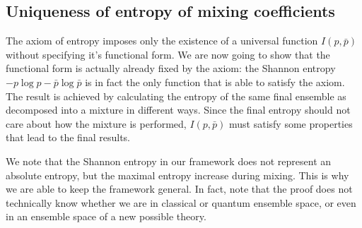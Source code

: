 \subsection{Uniqueness of entropy of mixing coefficients}

The axiom of entropy imposes only the existence of a universal function $I(p,\bar{p})$ without specifying it's functional form. We are now going to show that the functional form is actually already fixed by the axiom: the Shannon entropy $-p \log p - \bar{p} \log \bar{p}$ is in fact the only function that is able to satisfy the axiom. The result is achieved by calculating the entropy of the same final ensemble as decomposed into a mixture in different ways. Since the final entropy should not care about how the mixture is performed, $I(p,\bar{p})$ must satisfy some properties that lead to the final results.

We note that the Shannon entropy in our framework does not represent an absolute entropy, but the maximal entropy increase during mixing. This is why we are able to keep the framework general. In fact, note that the proof does not technically know whether we are in classical or quantum ensemble space, or even in an ensemble space of a new possible theory.

